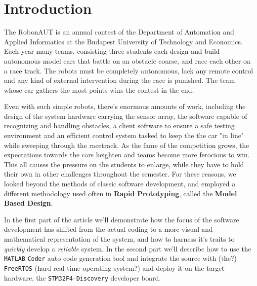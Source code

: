 \section{Introduction}
\label{sec:Introduction}

The RobonAUT is an annual contest of the Department of Automation and Applied Informatics at the Budapest University of Technology and Economics. Each year many teams, consisting three students each design and build autonomous model cars that battle on an obstacle course, and race each other on a race track. The robots must be completely autonomous, lack any remote control and any kind of external intervention during the race is punished. The team whose car gathers the most points wins the contest in the end\cite{rules}.

Even with such simple robots, there's enormous amounts of work, including the design of the system hardware carrying the sensor array, the software capable of recognizing and handling obstacles, a client software to ensure a safe testing environment and an efficient control system tasked to keep the the car "in line" while sweeping through the racetrack. As the fame of the competition grows, the expectations towards the cars heighten and teams become more ferocious to win. This all causes the pressure on the students to enlarge, while they have to hold their own in other challenges throughout the semester. For these reasons, we looked beyond the methods of classic software development, and employed a different methodology used often in \textbf{Rapid Prototyping}, called the \textbf{Model Based Design}.

In the first part of the article we'll demonstrate how the focus of the software development has shifted from the actual coding to a more visual and mathematical representation of the system, and how to harness it's traits to \emph{quickly} develop a \emph{reliable} system. In the second part we'll describe how to use the \verb!MATLAB! \verb!Coder! auto code generation tool and integrate the source with (the?) \verb!FreeRTOS! (hard real-time operating system?) and deploy it on the target hardware, the \verb!STM32F4-Discovery! developer board.